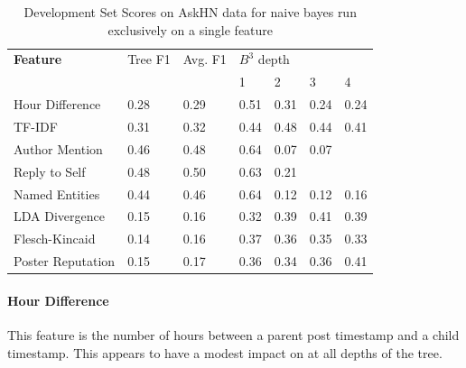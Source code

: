 \documentclass{article}
\begin{document}
\begin{table}[h]\footnotesize
 \begin{tabular}{| l | l | l | l | l | l | l |} 
   \hline
   \textbf{Feature} & Tree F1 & Avg. F1 & \multicolumn{4}{l|}{$B^3$ depth} \\
                      & & & 1 & 2 & 3 & 4\\
   \hline
      Hour Difference & 0.28 & 0.29 & 0.51 & 0.31 & 0.24 & 0.24 \\
               TF-IDF & 0.31 & 0.32 & 0.44 & 0.48 & 0.44 & 0.41 \\ 
       Author Mention & 0.46 & 0.48 & 0.64 & 0.07 & 0.07 & \\
        Reply to Self & 0.48 & 0.50 & 0.63 & 0.21 & & \\
Named Entities & 0.44 & 0.46 & 0.64 & 0.12 & 0.12 & 0.16 \\
               LDA Divergence & 0.15 & 0.16 & 0.32 & 0.39 & 0.41 & 0.39 \\
         Flesch-Kincaid & 0.14 & 0.16 & 0.37 & 0.36 & 0.35 & 0.33 \\
            Poster Reputation & 0.15 & 0.17 & 0.36 & 0.34 & 0.36 & 0.41 \\
   \hline
  \end{tabular}
  \caption{Development Set Scores on AskHN data for naive bayes run exclusively
  on a single feature}
  \label{table:perfeature}
\end{table}

\paragraph{Hour Difference} This feature is the number of hours between a parent 
post timestamp and a child timestamp. This appears to have a modest impact on
at all depths of the tree.
\end{document}
